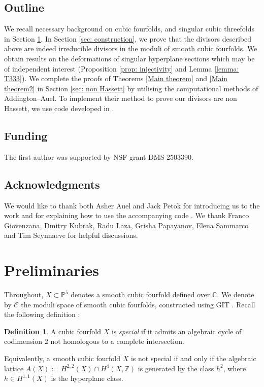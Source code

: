 \documentclass[12pt]{amsart}
\numberwithin{equation}{section}
\theoremstyle{plain}
\theoremstyle{remark}
\theoremstyle{definition}
\newtheorem{definition}[equation]{Definition}
\newcommand{\bP}{\mathbb{P}}
\newcommand{\bZ}{\mathbb{Z}}
\newcommand{\bC}{\mathbb{C}}
\newcommand{\calC}{\mathcal{C}}
\begin{document}
\subsection*{Outline}
We recall necessary background on cubic fourfolds, and singular cubic threefolds in Section \ref{sec: prelims}. In Section \ref{sec: construction}, we prove that the divisors described above are indeed irreducible divisors in the moduli of smooth cubic fourfolds. We obtain results on the deformations of singular hyperplane sections which may be of independent interest (Proposition \ref{prop: injectivity} and Lemma \ref{lemma: T333}). We complete the proofs of Theorems \ref{Main theorem} and \ref{Main theorem2} in Section \ref{sec: non Hassett} by utilising the computational methods of Addington--Auel. To implement their method to prove our divisors are non Hassett, we use code developed in \cite{AKPW, F2code}.

\subsection*{Funding}
The first author was supported by NSF grant DMS-2503390.

\subsection*{Acknowledgments} We would like to thank both Asher Auel and Jack Petok for introducing us to the work \cite{AKPW} and for explaining how to use the accompanying code \cite{F2code}.
We thank Franco Giovenzana, Dmitry Kubrak, Radu Laza, Grisha Papayanov, Elena Sammarco and Tim Seynnaeve for helpful discussions.

\section{Preliminaries}\label{sec: prelims}

Throughout, $X\subset \bP^5$ denotes a smooth cubic fourfold defined over $\bC.$ We denote by $\calC$ the moduli space of smooth cubic fourfolds, constructed using GIT \cite{Laz09}. Recall the following definition \cite{hassett}:

\begin{definition}
    A cubic fourfold $X$ is \textit{special} if it admits an algebraic cycle of codimension $2$ not homologous to a complete intersection.
\end{definition}

Equivalently, a smooth cubic fourfold $X$ is not special if and only if the algebraic lattice $A(X):=H^{2,2}(X)\cap H^4(X,\bZ)$
is generated by the class $h^2$, where $h\in H^{1,1}(X)$ is the hyperplane class.
\end{document}
